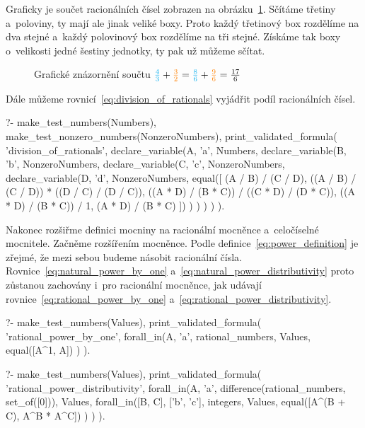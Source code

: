 Graficky je součet racionálních čísel zobrazen na obrázku~\ref{img:add_rational_numbers}. Sčítáme třetiny a~poloviny, ty mají ale jinak veliké boxy. Proto každý třetinový box rozdělíme na dva stejné a~každý polovinový box rozdělíme na tři stejné. Získáme tak boxy o~velikosti jedné šestiny jednotky, ty pak už můžeme sčítat.

\begin{figure}[!h]
\centering
{}
\caption{Grafické znázornění součtu \(\textcolor{cyan}{\frac{4}{3}} + \textcolor{orange}{\frac{3}{2}} = \textcolor{cyan}{\frac{8}{6}} + \textcolor{orange}{\frac{9}{6}} = \frac{17}{6}\)}
\label{img:add_rational_numbers}
\end{figure}

Dále můžeme rovnicí~\eqref{eq:division_of_rationals} vyjádřit podíl racionálních čísel.

\begin{prolog}
?-	make_test_numbers(Numbers),
	make_test_nonzero_numbers(NonzeroNumbers),
	print_validated_formula(
		'division_of_rationals',
		declare_variable(A, 'a', Numbers,
			declare_variable(B, 'b', NonzeroNumbers,
				declare_variable(C, 'c', NonzeroNumbers,
					declare_variable(D, 'd', NonzeroNumbers,
						equal([
							(A / B) / (C / D),
							((A / B) / (C / D)) * ((D / C) / (D / C)),
							((A * D) / (B * C)) / ((C * D) / (D * C)),
							((A * D) / (B * C)) / 1,
							(A * D) / (B * C)
						])
					)
				)
			)
		)
	).
\end{prolog}

Nakonec rozšiřme definici mocniny na racionální mocněnce a~celočíselné mocnitele. Začněme rozšířením mocněnce. Podle definice~\eqref{eq:power_definition} je zřejmé, že mezi sebou budeme násobit racionální čísla. Rovnice~\eqref{eq:natural_power_by_one} a~\eqref{eq:natural_power_distributivity} proto zůstanou zachovány i~pro racionální mocněnce, jak udávají rovnice~\eqref{eq:rational_power_by_one} a~\eqref{eq:rational_power_distributivity}.

\begin{fact}
\begin{prolog}
?-	make_test_numbers(Values),
	print_validated_formula(
		'rational_power_by_one',
		forall_in(A, 'a', rational_numbers, Values,
			equal([A^1, A])
		)
	).				
\end{prolog}
\begin{prolog}
?-	make_test_numbers(Values),
	print_validated_formula(
		'rational_power_distributivity',
		forall_in(A, 'a', difference(rational_numbers, set_of([0])), Values,
			forall_in([B, C], ['b', 'c'], integers, Values,
				equal([A^(B + C), A^B * A^C])
			)
		)
	).				
\end{prolog}
\end{fact}

